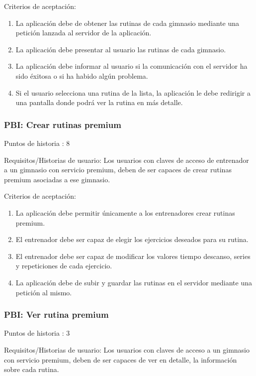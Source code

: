\documentclass[11pt,a4paper]{report}
\begin{document}
Criterios de aceptación:
\begin{enumerate}
	\item La aplicación debe de obtener las rutinas de cada gimnasio mediante una petición lanzada al servidor de la aplicación.
	
	\item La aplicación debe presentar al usuario las rutinas de cada gimnasio.
	
	\item La aplicación debe informar al usuario si la comunicación con el servidor ha sido éxitosa o si ha habido algún problema.
	\item Si el usuario selecciona una rutina de la lista, la aplicación le debe redirigir a una pantalla donde podrá ver la rutina en más detalle.
	
\end{enumerate}
\subsubsection{PBI: Crear rutinas premium}
Puntos de historia : 8

Requisitos/Historias de usuario: Los usuarios con claves de acceso de entrenador a un gimnasio con servicio premium, deben de ser capaces de crear rutinas premium asociadas a ese gimnasio.

Criterios de aceptación:
\begin{enumerate}
	\item La aplicación debe permitir únicamente a los entrenadores crear rutinas premium.
	
	\item El entrenador debe ser capaz de elegir los ejercicios deseados para su rutina.
	
	\item El entrenador debe ser capaz de modificar los valores tiempo descanso, series y repeticiones de cada ejercicio.
	
	\item La aplicación debe de subir y guardar las rutinas en el servidor mediante una petición al mismo.
	
\end{enumerate}
\subsubsection{PBI: Ver rutina premium}
Puntos de historia : 3

Requisitos/Historias de usuario: Los usuarios con claves de acceso a un gimnasio con servicio premium, deben de ser capaces de ver en detalle, la información sobre cada rutina.
\end{document}
